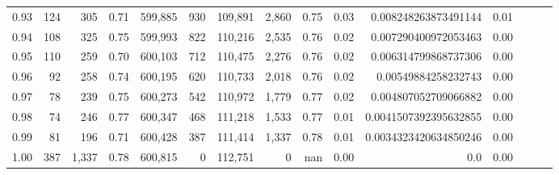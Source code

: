 \begin{tabular}{rrrrrrrrrrrrrrr}
0.93 &     124 &    305 &  0.71 &  599,885 &      930 &  109,891 &    2,860 &  0.75 &  0.03 &   0.008248263873491144 &      0.01 \\
0.94 &     108 &    325 &  0.75 &  599,993 &      822 &  110,216 &    2,535 &  0.76 &  0.02 &   0.007290400972053463 &      0.00 \\
0.95 &     110 &    259 &  0.70 &  600,103 &      712 &  110,475 &    2,276 &  0.76 &  0.02 &   0.006314799868737306 &      0.00 \\
0.96 &      92 &    258 &  0.74 &  600,195 &      620 &  110,733 &    2,018 &  0.76 &  0.02 &    0.00549884258232743 &      0.00 \\
0.97 &      78 &    239 &  0.75 &  600,273 &      542 &  110,972 &    1,779 &  0.77 &  0.02 &   0.004807052709066882 &      0.00 \\
0.98 &      74 &    246 &  0.77 &  600,347 &      468 &  111,218 &    1,533 &  0.77 &  0.01 &  0.0041507392395632855 &      0.00 \\
0.99 &      81 &    196 &  0.71 &  600,428 &      387 &  111,414 &    1,337 &  0.78 &  0.01 &  0.0034323420634850246 &      0.00 \\
1.00 &     387 &  1,337 &  0.78 &  600,815 &        0 &  112,751 &        0 &   nan &  0.00 &                    0.0 &      0.00 \\
\bottomrule
\end{tabular}
